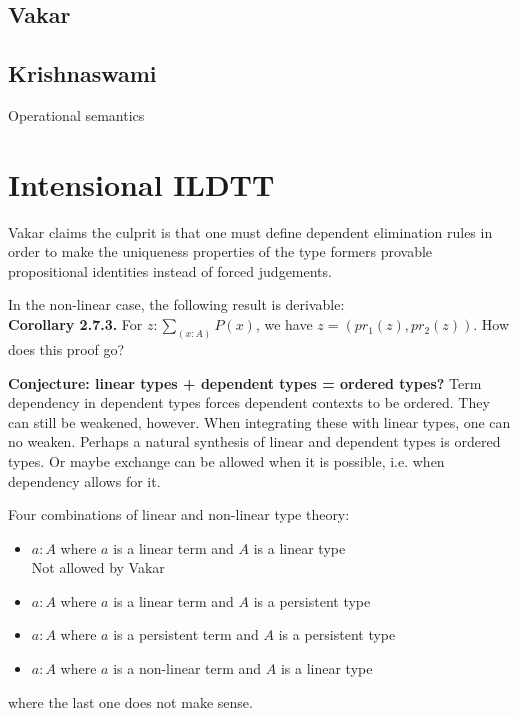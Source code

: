 \subsection*{Vakar}
\subsection*{Krishnaswami}

Operational semantics
\section{Intensional ILDTT}
Vakar claims the culprit is that one must define dependent elimination rules in order to make the uniqueness properties of the type formers provable propositional identities instead of forced judgements.

In the non-linear case, the following result is derivable:\\
\textbf{Corollary 2.7.3.} For $z : \sum_{(x:A)} P(x)$, we have $z = (pr_1(z), pr_2(z))$.
How does this proof go?

\textbf{Conjecture: linear types + dependent types = ordered types?}
Term dependency in dependent types forces dependent contexts to be ordered. They can still be weakened, however. When integrating these with linear types, one can no weaken. Perhaps a natural synthesis of linear and dependent types is ordered types. Or maybe exchange can be allowed when it is possible, i.e. when dependency allows for it.

Four combinations of linear and non-linear type theory:
\begin{itemize}
\item $a : A $ where $a$ is a linear term and $A$ is a linear type\\
  Not allowed by Vakar
\item $a : A $ where $a$ is a linear term and $A$ is a persistent type\\
  
\item $a : A $ where $a$ is a persistent term and $A$ is a persistent type
\item $a : A $ where $a$ is a non-linear term and $A$ is a linear type
\end{itemize}
where the last one does not make sense.

